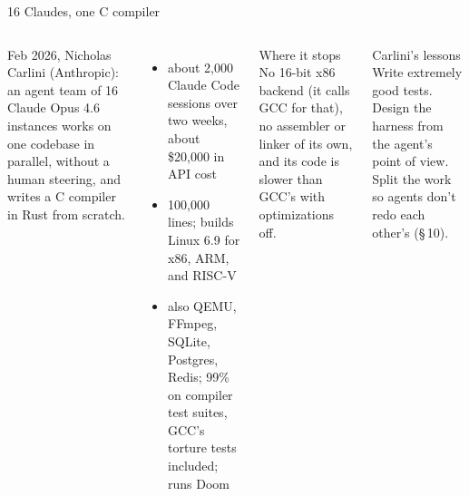 \documentclass[aspectratio=169,11pt,t]{beamer}
\begin{document}
\begin{frame}{16 Claudes, one C compiler}
  \begin{columns}[T,onlytextwidth]
      \small Feb 2026, Nicholas Carlini (Anthropic): an agent team of 16 Claude Opus 4.6 instances works on one codebase in parallel, without a human steering, and writes a C compiler in Rust from scratch.\par\vspace{0.5em}
      \begin{itemize}\footnotesize\setlength\itemsep{0.25em}
        \item about 2,000 Claude Code sessions over two weeks, about \$20,000 in API cost
        \item 100,000 lines; builds Linux 6.9 for x86, ARM, and RISC-V
        \item also QEMU, FFmpeg, SQLite, Postgres, Redis; 99\% on compiler test suites, GCC's torture tests included; runs Doom
      \end{itemize}
      \begin{callout}[warn]{Where it stops}
        \footnotesize No 16-bit x86 backend (it calls GCC for that), no assembler or linker of its own, and its code is slower than GCC's with optimizations off.
      \end{callout}\par\vspace{0.4em}
      \begin{callout}[good]{Carlini's lessons}
        \footnotesize Write extremely good tests. Design the harness from the agent's point of view. Split the work so agents don't redo each other's (\S\,10).
      \end{callout}
  \end{columns}
\end{frame}
\end{document}
